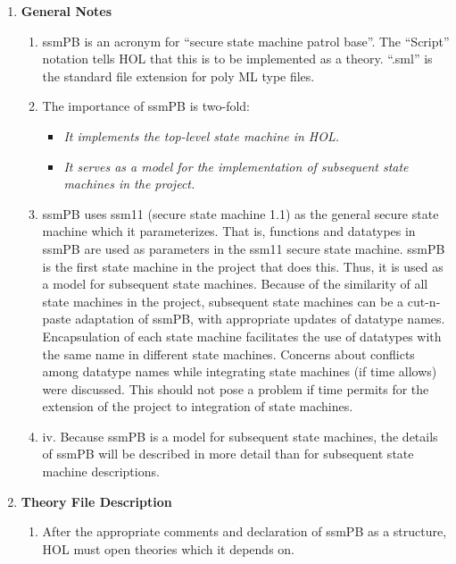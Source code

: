 \begin{enumerate}
\item \textbf{General Notes}
  \begin{enumerate}
  \item ssmPB is an acronym for “secure state machine patrol base”.  The “Script” notation
    tells HOL that this is to be implemented as a theory.  “.sml” is the standard
    file extension for poly ML type files.\ \\
  \item The importance of ssmPB is two-fold:
    \begin{itemize}
    \item \textit{It implements the top-level state machine in HOL.}
      \item \textit{It serves as a model for the implementation of subsequent state machines in the project.}\ \\
      \end{itemize}
    \item ssmPB uses ssm11 (secure state machine 1.1) as the general secure state machine which it
      parameterizes.  That is, functions and datatypes in ssmPB are used as parameters in the ssm11
      secure state machine.   ssmPB is the first state machine in the project that does this.  Thus,
      it is used as a model for subsequent state machines.  Because of the similarity of all state
      machines in the project, subsequent state machines can be a cut-n-paste adaptation of ssmPB,
      with appropriate updates of datatype names.  Encapsulation of each state machine facilitates
      the use of datatypes with the same name in different state machines.  Concerns about conflicts
      among datatype names while integrating state machines (if time allows) were discussed.  This
      should not pose a problem if time permits for the extension of the project to integration of
      state machines.\ \\
    \item iv.	Because ssmPB is a model for subsequent state machines, the details of ssmPB will
      be described in more detail than for subsequent state machine descriptions.\ \\
    \end{enumerate}
  \item \textbf{Theory File Description}
    \begin{enumerate}
    \item After the appropriate comments and declaration of ssmPB as a structure, HOL must open
      theories which it depends on.

\end{enumerate}
\end{enumerate}
